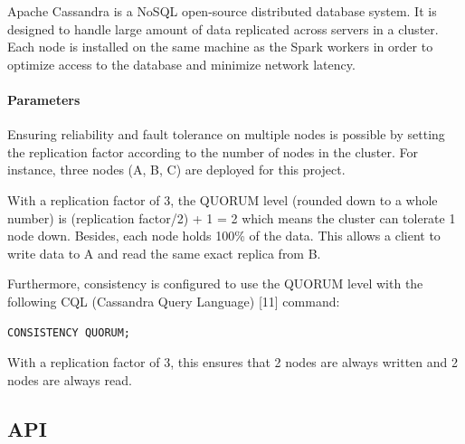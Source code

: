 \documentclass[11pt]{article}
\begin{document}
\textsf{Apache Cassandra} is a \textsf{NoSQL} open-source distributed database system. It is designed to handle large amount of data replicated across servers in a cluster. Each node is installed on the same machine as the \textsf{Spark} workers in order to optimize access to the database and minimize network latency.

\paragraph{Parameters}

Ensuring reliability and fault tolerance on multiple nodes is possible by setting the replication factor according to the number of nodes in the cluster. For instance, three nodes (A, B, C) are deployed for this project. 

With a replication factor of 3, the QUORUM level (rounded down to a whole number) is (replication factor/2) + 1 = 2 which means the cluster can tolerate 1 node down. Besides, each node holds 100\% of the data. This allows a client to write data to A and read the same exact replica from B.

Furthermore, consistency is configured to use the QUORUM level with the following \textsf{CQL} (\textsf{Cassandra} Query Language) [11] command:

\begin{lstlisting}[xleftmargin=5cm]
    CONSISTENCY QUORUM;
\end{lstlisting}
With a replication factor of 3, this ensures that 2 nodes are always written and 2 nodes are always read.



          

\subsection{API}
\end{document}

